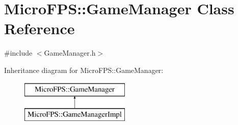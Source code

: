 \hypertarget{class_micro_f_p_s_1_1_game_manager}{
\section{MicroFPS::GameManager Class Reference}
\label{d8/d88/class_micro_f_p_s_1_1_game_manager}
}


{\ttfamily \#include $<$GameManager.h$>$}

Inheritance diagram for MicroFPS::GameManager:\begin{figure}[H]
\begin{center}
\leavevmode
\includegraphics[height=2.000000cm]{d8/d88/class_micro_f_p_s_1_1_game_manager}
\end{center}
\end{figure}
